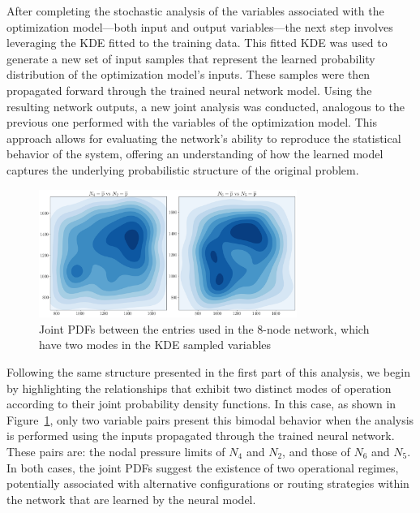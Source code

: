 After completing the stochastic analysis of the variables associated with the optimization model—both input and output variables—the next step involves leveraging the KDE fitted to the training data. This fitted KDE was used to generate a new set of input samples that represent the learned probability distribution of the optimization model's inputs. These samples were then propagated forward through the trained neural network model. Using the resulting network outputs, a new joint analysis was conducted, analogous to the previous one performed with the variables of the optimization model. This approach allows for evaluating the network's ability to reproduce the statistical behavior of the system, offering an understanding of how the learned model captures the underlying probabilistic structure of the original problem.



\begin{figure}
    \begin{center}
        \includegraphics[width=0.75\textwidth]{figures/Chapter_NonLinealCensnet/PDF_inputs_inputs (Sampled).png}
    \end{center}
    \caption{Joint PDFs between the entries used in the 8-node network, which have two modes in the KDE sampled variables}
    \label{fig:joint_distributions_input_input_KDE}
\end{figure}
     

Following the same structure presented in the first part of this analysis, we begin by highlighting the relationships that exhibit two distinct modes of operation according to their joint probability density functions. In this case, as shown in Figure~\cref{fig:joint_distributions_input_input_KDE}, only two variable pairs present this bimodal behavior when the analysis is performed using the inputs propagated through the trained neural network. These pairs are: the nodal pressure limits of $N_4$ and $N_2$, and those of $N_6$ and $N_5$. In both cases, the joint PDFs suggest the existence of two operational regimes, potentially associated with alternative configurations or routing strategies within the network that are learned by the neural model. 


